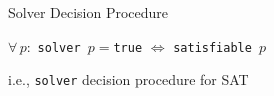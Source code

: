 \documentclass[aspectratio=169,xcolor=dvipsnames]{beamer}
\begin{document}
    \begin{frame}{Solver Decision Procedure}
        \begin{theorem}
            $\forall\,p :$ \texttt{solver $p =$true} $\Longleftrightarrow$ \texttt{satisfiable $p$}
        \end{theorem}

        \pause
        
        \begin{center}
            \Large i.e., \texttt{solver} decision procedure for SAT
        \end{center}

    \end{frame}
\end{document}
